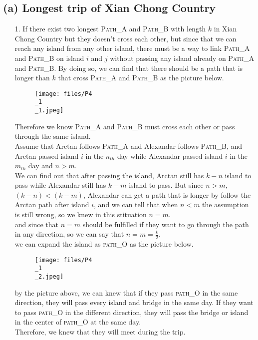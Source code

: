 \documentclass{homework}
\begin{document}
\subsection*{(a) Longest trip of Xian Chong Country}
\begin{itemize}
    \item[1.]
        If there exist two longest \textsc{Path\_A} and \textsc{Path\_B} with length $k$ in Xian Chong Country but they doesn't cross each other, but since that we can reach any island from any other island, there must be a way to link \textsc{Path\_A} and \textsc{Path\_B} on island $i$ and $j$ without passing any island already on \textsc{Path\_A} and \textsc{Path\_B}. By doing so, we can find that there should be a path that is longer than $k$ that cross \textsc{Path\_A} and \textsc{Path\_B} as the picture below.
        \begin{figure}[H]
            \centering
            \texttt{[image: files/P4\\\_1\\\_1.jpeg]}
        \end{figure}
        Therefore we know \textsc{Path\_A} and \textsc{Path\_B} must cross each other or pass through the same island.\\
        Assume that Arctan follows \textsc{Path\_A} and Alexandar follows \textsc{Path\_B}, and Arctan passed island $i$ in the $n_{th}$ day while Alexandar passed island $i$ in the $m_{th}$ day and $n > m$.\\
        We can find out that after passing the island, Arctan still has $k-n$ island to pass while Alexandar still has $k-m$ island to pass. But since $n > m$, $(k-n) < (k-m)$, Alexandar can get a path that is longer by follow the Arctan path  after island $i$, and we can tell that when $n < m$ the assumption is still wrong, so we knew in this stituation $n = m$.\\
        and since that  $n = m$ should be fulfilled if they want to go through the path in any direction, so we can say that $n = m = \frac{k}{2}$.\\
        we can expand the island as \textsc{path\_O} as the picture below.
        \begin{figure}[H]
            \centering
            \texttt{[image: files/P4\\\_1\\\_2.jpeg]}
        \end{figure}
        by the picture above, we can knew that if they pass \textsc{path\_O} in the same direction, they will pass every island and bridge in the same day. If they want to pass \textsc{path\_O} in the different direction, they will pass the bridge or island in the center of \textsc{path\_O} at the same day.\\
        Therefore, we knew that they will meet during the trip.
\clearpage


\end{itemize}
\end{document}
